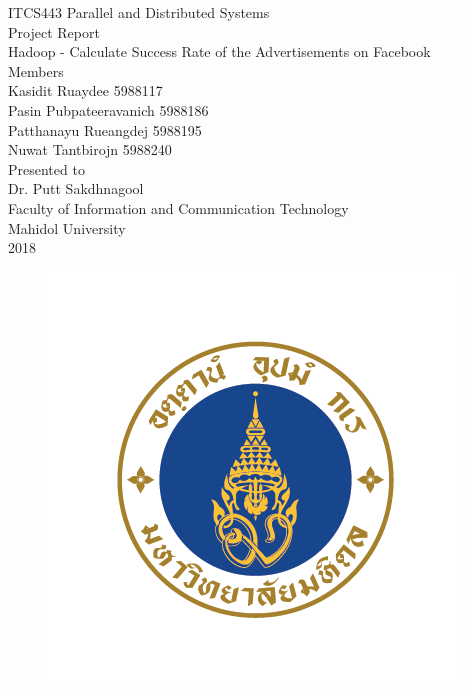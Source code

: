\documentclass[11pt]{article}
\begin{document}
\begin{titlepage}

	\begin{center}
	
	\huge ITCS443 Parallel and Distributed Systems\\
	[0.8cm]
	\LARGE Project Report\\
	[0.3cm]
	\Large Hadoop - Calculate Success Rate of the Advertisements on Facebook\\
	[1.5cm]
	\LARGE Members\\
	[0.5cm]
	\Large Kasidit   	Ruaydee   		   5988117\\
	[0.2cm]
	\Large Pasin        Pubpateeravanich   5988186\\
	[0.2cm] 
	\Large Patthanayu   Rueangdej   	   5988195\\ 
	[0.2cm]
	\Large Nuwat   		Tantbirojn   	   5988240\\    
	[1.5cm]
	\LARGE Presented to\\
	[0.2cm]
	\Large Dr. Putt Sakdhnagool\\
	[1.5cm]
	\Large Faculty of Information and Communication Technology\\
	[0.2cm]
	\Large Mahidol University\\
	[0.2cm]
	\Large 2018
	\begin{figure}[h]
	\centering
	\includegraphics[scale=0.35]{mu}
	\end{figure}
	
	\end{center}
	
\end{titlepage}
\end{document}
